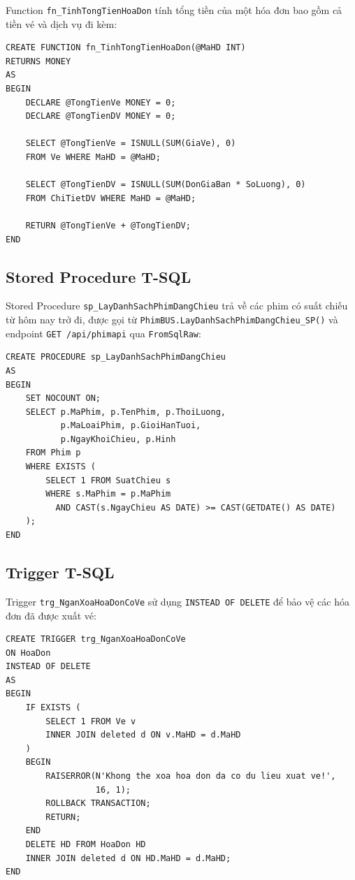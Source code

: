 \documentclass[12pt,a4paper,oneside]{book}
\theoremstyle{plain}
\numberwithin{equation}{chapter}
\begin{document}
\noindent Function \texttt{fn\_TinhTongTienHoaDon} tính tổng tiền của một hóa đơn bao gồm cả tiền vé và dịch vụ đi kèm:

\begin{lstlisting}[style=sqlstyle, caption={Scalar Function tính tổng tiền hóa đơn}]
CREATE FUNCTION fn_TinhTongTienHoaDon(@MaHD INT)
RETURNS MONEY
AS
BEGIN
    DECLARE @TongTienVe MONEY = 0;
    DECLARE @TongTienDV MONEY = 0;
    
    SELECT @TongTienVe = ISNULL(SUM(GiaVe), 0)
    FROM Ve WHERE MaHD = @MaHD;
    
    SELECT @TongTienDV = ISNULL(SUM(DonGiaBan * SoLuong), 0)
    FROM ChiTietDV WHERE MaHD = @MaHD;
    
    RETURN @TongTienVe + @TongTienDV;
END
\end{lstlisting}

\subsection{Stored Procedure T-SQL}

\noindent Stored Procedure \texttt{sp\_LayDanhSachPhimDangChieu} trả về các phim có suất chiếu từ hôm nay trở đi, được gọi từ \texttt{PhimBUS.LayDanhSachPhimDangChieu\_SP()} và endpoint \texttt{GET /api/phimapi} qua \texttt{FromSqlRaw}:

\begin{lstlisting}[style=sqlstyle, caption={Stored Procedure lấy phim đang chiếu}]
CREATE PROCEDURE sp_LayDanhSachPhimDangChieu
AS
BEGIN
    SET NOCOUNT ON;
    SELECT p.MaPhim, p.TenPhim, p.ThoiLuong, 
           p.MaLoaiPhim, p.GioiHanTuoi, 
           p.NgayKhoiChieu, p.Hinh
    FROM Phim p
    WHERE EXISTS (
        SELECT 1 FROM SuatChieu s 
        WHERE s.MaPhim = p.MaPhim 
          AND CAST(s.NgayChieu AS DATE) >= CAST(GETDATE() AS DATE)
    );
END
\end{lstlisting}

\subsection{Trigger T-SQL}

\noindent Trigger \texttt{trg\_NganXoaHoaDonCoVe} sử dụng \texttt{INSTEAD OF DELETE} để bảo vệ các hóa đơn đã được xuất vé:

\begin{lstlisting}[style=sqlstyle, caption={Trigger ngăn xóa hóa đơn đã có vé}]
CREATE TRIGGER trg_NganXoaHoaDonCoVe
ON HoaDon
INSTEAD OF DELETE
AS
BEGIN
    IF EXISTS (
        SELECT 1 FROM Ve v
        INNER JOIN deleted d ON v.MaHD = d.MaHD
    )
    BEGIN
        RAISERROR(N'Khong the xoa hoa don da co du lieu xuat ve!',
                  16, 1);
        ROLLBACK TRANSACTION;
        RETURN;
    END
    DELETE HD FROM HoaDon HD
    INNER JOIN deleted d ON HD.MaHD = d.MaHD;
END
\end{lstlisting}
\end{document}
